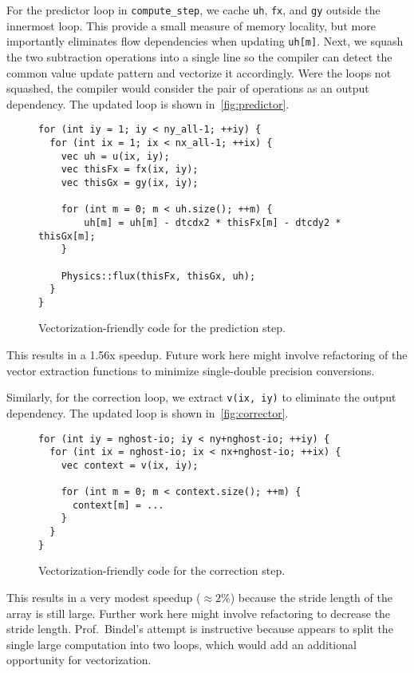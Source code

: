\documentclass{scrartcl}
\begin{document}
    For the predictor loop in \verb|compute_step|, we cache \verb|uh|, \verb|fx|, and \verb|gy| outside the innermost loop. This provide a small measure of memory locality, but more importantly eliminates flow dependencies when updating \verb|uh[m]|. Next, we squash the two subtraction operations into a single line so the compiler can detect the common value update pattern and vectorize it accordingly. Were the loops not squashed, the compiler would consider the pair of operations as an output dependency. The updated loop is shown in~\autoref{fig:predictor}.

    \begin{figure}[ht!]
\begin{lstlisting}
for (int iy = 1; iy < ny_all-1; ++iy) {
  for (int ix = 1; ix < nx_all-1; ++ix) {
    vec uh = u(ix, iy);
    vec thisFx = fx(ix, iy);
    vec thisGx = gy(ix, iy);

    for (int m = 0; m < uh.size(); ++m) {
        uh[m] = uh[m] - dtcdx2 * thisFx[m] - dtcdy2 * thisGx[m];
    }

    Physics::flux(thisFx, thisGx, uh);
  }
}
    \end{lstlisting}
    \caption{Vectorization-friendly code for the prediction step.\label{fig:predictor}}
    \end{figure}

    This results in a 1.56x speedup. Future work here might involve refactoring of the vector extraction functions to minimize single-double precision conversions.

    Similarly, for the correction loop, we extract \verb|v(ix, iy)| to eliminate the output dependency. The updated loop is shown in~\autoref{fig:corrector}.

    \begin{figure}[ht!]
    \begin{lstlisting}
for (int iy = nghost-io; iy < ny+nghost-io; ++iy) {
  for (int ix = nghost-io; ix < nx+nghost-io; ++ix) {
    vec context = v(ix, iy);

    for (int m = 0; m < context.size(); ++m) {
      context[m] = ...
    }
  }
}
    \end{lstlisting}
    \caption{Vectorization-friendly code for the correction step.\label{fig:corrector}}
    \end{figure}

    This results in a very modest speedup ($\approx2\%$) because the stride length of the array is still large. Further work here might involve refactoring to decrease the stride length. Prof.~Bindel's attempt is instructive because appears to split the single large computation into two loops, which would add an additional opportunity for vectorization.
\end{document}
